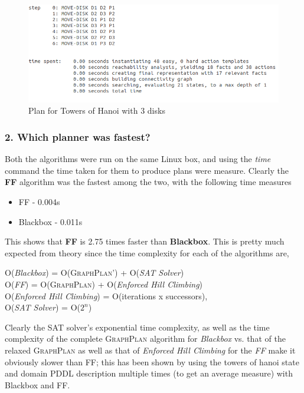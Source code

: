 \documentclass[10pt, letter]{article}
\begin{document}
\begin{figure}[h!]
  \centering
    \includegraphics[scale = 0.5]{images/hanoi-3}
    \caption{Plan for Towers of Hanoi with 3 disks}
  \label{plan1}
\end{figure}

\subsubsection*{2. Which planner was fastest?}
\label{subsubsec_2}
Both the algorithms were run on the same Linux box, and using the \textit{time} command the time taken for them to produce plans were measure. Clearly the \textbf{FF} algorithm was the fastest among the two, with the following time measures \\
\begin{itemize}
\item FF - 0.004s
\item Blackbox - 0.011s
\end{itemize}
This shows that \textbf{FF} is 2.75 times faster than \textbf{Blackbox}. This is pretty much expected from theory since the time complexity for each of the algorithms are,
\begin{center}
	O(\textit{Blackbox}) = O(\textsc{GraphPlan'}) + O(\textit{SAT Solver})\\
	O(\textit{FF}) = O(\textsc{GraphPlan}) + O(\textit{Enforced Hill Climbing})\\
	O(\textit{Enforced Hill Climbing}) = O(iterations x successors),\\
	O(\textit{SAT Solver}) = O($2^n$)
\end{center}
Clearly the SAT solver's exponential time complexity, as well as the time complexity of the complete \textsc{GraphPlan} algorithm for \textit{Blackbox} vs. that of the relaxed \textsc{GraphPlan} as well as that of \textit{Enforced Hill Climbing} for the \textit{FF} make it obviously slower than FF; this has been shown by using the towers of hanoi state and domain PDDL description multiple times (to get an average measure) with Blackbox and FF.
\end{document}
